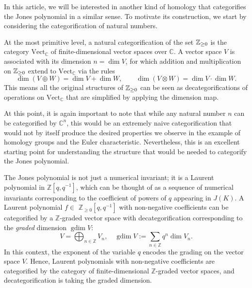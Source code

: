 \documentclass[a4paper,onecolumn,unpublished]{quantumarticle}
\theoremstyle{plain}
\theoremstyle{definition}
\theoremstyle{definition}
\numberwithin{equation}{section}
\begin{document}
In this article, we will be interested in another kind of homology that categorifies the Jones polynomial in a similar sense. To motivate its construction, we start by considering the categorification of natural numbers. 
  
 
At the most primitive level, a natural categorification of the set $\mathbb{Z}_{\geq 0}$ is the category $\text{Vect}_\mathbb{C}$ of finite-dimensional vector spaces over  $\mathbb C$. A vector space $V$ is associated with its dimension $n = \operatorname{dim} V$, for which addition and multiplication on $\mathbb{Z}_{\geq 0}$ extend to $\text{Vect}_\mathbb{C}$ via the rules
\begin{equation}
 \operatorname{dim}(V \oplus W)=\operatorname{dim} V+\operatorname{dim} W, \qquad 
 \operatorname{dim}(V \otimes W)=\operatorname{dim} V \cdot \operatorname{dim} W.
\end{equation}
This means all the original structures of $\mathbb{Z}_{\geq 0}$ can be seen as decategorifications of operations on $\text{Vect}_\mathbb{C}$ that are simplified by applying the dimension map. 

At this point, it is again important to note that while any natural number $n$ can be categorified by $\mathbb{C}^n$, this would be an extremely naive categorification that would not by itself produce the desired properties we observe in the example of homology groups and the Euler characteristic.  Nevertheless, this is an excellent starting point for understanding the structure that would be needed to categorify the Jones polynomial.  


The Jones polynomial is not just a numerical invariant; it is a Laurent polynomial in $\mathbb{Z}[q,q^{-1}]$, which can be thought of as a sequence of numerical invariants corresponding to the coefficient of powers of $q$ appearing in $J(K)$. A Laurent polynomial $f \in$ $\mathbb{Z}_{\geq 0}\left[q, q^{-1}\right]$ with non-negative coefficients can be categorified by a $\mathbb{Z}$-graded vector space with decategorification corresponding to the \emph{graded} dimension $\operatorname{gdim} V$:
\begin{equation}
V=\bigoplus_{n \in \mathbb{Z}} V_n, \quad \operatorname{gdim} V:=\sum_{n \in \mathbb{Z}} q^n \operatorname{dim} V_n .
\end{equation}
In this context, the exponent of the variable $q$ encodes the grading on the vector space $V$. 
Hence, Laurent polynomials with non-negative coefficients are categorified by the category of finite-dimensional $\mathbb{Z}$-graded vector spaces, and decategorification is taking the graded dimension. 
 
\end{document}
